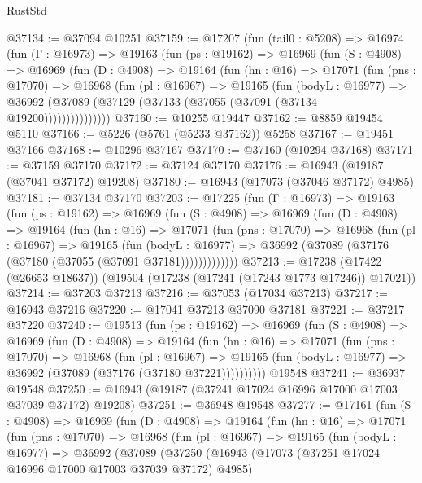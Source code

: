 \begin{lexlean}{RustStd}
\begin{coremodule}
@37134 := @37094 @10251
@37159 := @17207
    (fun (tail0 : @5208) =>
    @16974
      (fun (Γ : @16973) =>
      @19163
        (fun (ps : @19162) =>
        @16969
          (fun (S : @4908) =>
          @16969
            (fun (D : @4908) =>
            @19164
              (fun (hn : @16) =>
              @17071
                (fun (pns : @17070) =>
                @16968
                  (fun (pl : @16967) =>
                  @19165
                    (fun (bodyL : @16977) =>
                    @36992 (@37089 (@37129 (@37133 (@37055 (@37091 (@37134 @19200)))))))))))))))
@37160 := @10255 @19447
@37162 := @8859 @19454 @5110
@37166 := @5226 (@5761 (@5233 @37162)) @5258
@37167 := @19451 @37166
@37168 := @10296 @37167
@37170 := @37160 (@10294 @37168)
@37171 := @37159 @37170
@37172 := @37124 @37170
@37176 := @16943 (@19187 (@37041 @37172) @19208)
@37180 := @16943 (@17073 (@37046 @37172) @4985)
@37181 := @37134 @37170
@37203 := @17225
    (fun (Γ : @16973) =>
    @19163
      (fun (ps : @19162) =>
      @16969
        (fun (S : @4908) =>
        @16969
          (fun (D : @4908) =>
          @19164
            (fun (hn : @16) =>
            @17071
              (fun (pns : @17070) =>
              @16968
                (fun (pl : @16967) =>
                @19165
                  (fun (bodyL : @16977) =>
                  @36992 (@37089 (@37176 (@37180 (@37055 (@37091 @37181)))))))))))))
@37213 := @17238 (@17422 (@26653 @18637)) (@19504 (@17238 (@17241 (@17243 @1773 @17246)) @17021))
@37214 := @37203 @37213
@37216 := @37053 (@17034 @37213)
@37217 := @16943 @37216
@37220 := @17041 @37213 @37090 @37181
@37221 := @37217 @37220
@37240 := @19513
    (fun (ps : @19162) =>
    @16969
      (fun (S : @4908) =>
      @16969
        (fun (D : @4908) =>
        @19164
          (fun (hn : @16) =>
          @17071
            (fun (pns : @17070) =>
            @16968
              (fun (pl : @16967) =>
              @19165 (fun (bodyL : @16977) => @36992 (@37089 (@37176 (@37180 @37221))))))))))
    @19548
@37241 := @36937 @19548
@37250 := @16943 (@19187 (@37241 @17024 @16996 @17000 @17003 @37039 @37172) @19208)
@37251 := @36948 @19548
@37277 := @17161
    (fun (S : @4908) =>
    @16969
      (fun (D : @4908) =>
      @19164
        (fun (hn : @16) =>
        @17071
          (fun (pns : @17070) =>
          @16968
            (fun (pl : @16967) =>
            @19165
              (fun (bodyL : @16977) =>
              @36992
                (@37089
                  (@37250
                    (@16943
                      (@17073 (@37251 @17024 @16996 @17000 @17003 @37039 @37172) @4985)

\end{coremodule}
\end{lexlean}
